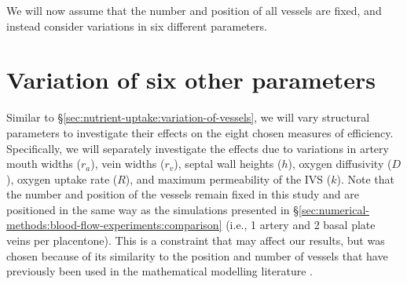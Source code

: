             


            We will now assume that the number and position of all vessels are fixed, and instead consider variations in six different parameters.

    \section{Variation of six other parameters} \label{sec:nutrient-uptake:variation-of-other-parameters}        
        Similar to \S\ref{sec:nutrient-uptake:variation-of-vessels}, we will vary structural parameters to investigate their effects on the eight chosen measures of efficiency. Specifically, we will separately investigate the effects due to variations in artery mouth widths ($r_a$), vein widths ($r_v$), septal wall heights ($h$), oxygen diffusivity ($D$), oxygen uptake rate ($R$), and maximum permeability of the IVS ($k$). Note that the number and position of the vessels remain fixed in this study and are positioned in the same way as the simulations presented in \S\ref{sec:numerical-methods:blood-flow-experiments:comparison} (i.e., 1 artery and 2 basal plate veins per placentone). This is a constraint that may affect our results, but was chosen because of its similarity to the position and number of vessels that have previously been used in the mathematical modelling literature \cite{lecarpentierComputationalFluidDynamic2016,chernyavskyMathematicalModelIntervillous2010}.
        
